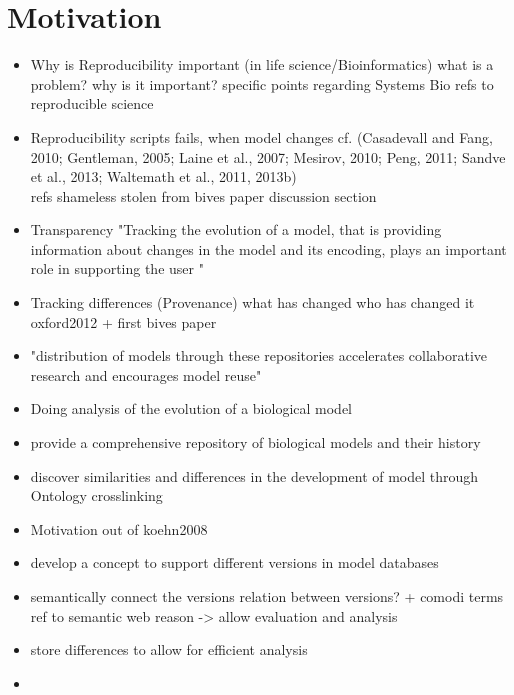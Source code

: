 \section{Motivation}

\begin{itemize}
\item Why is Reproducibility important (in life science/Bioinformatics)
	\subitem what is a problem?
	\subitem why is it important?
	\subitem specific points regarding Systems Bio
	\subitem refs to reproducible science
\item Reproducibility
	\subitem \sedml scripts fails, when model changes
	\subitem cf. (Casadevall and Fang, 2010; Gentleman, 2005; Laine et al., 2007; Mesirov, 2010; Peng, 2011; Sandve et al., 2013; Waltemath et al., 2011, 2013b) \\ refs shameless stolen from bives paper discussion section

\item Transparency
	\subitem "Tracking the evolution of a model, that is providing information about changes in the model and its encoding, plays an important role in supporting the user " \cite{Scharm2015}
\item Tracking differences (Provenance)
	\subitem what has changed
	\subitem who has changed it
	\subitem oxford2012 + first bives paper

\item "distribution of models through these repositories accelerates collaborative research and encourages model reuse" \cite{Scharm2015}

\item Doing analysis of the evolution of a biological model
\item provide a comprehensive repository of biological models and their history
\item discover similarities and differences in the development of model through Ontology crosslinking
\item Motivation out of koehn2008 \cite{Kohn2008}
\end{itemize}

\begin{itemize}
\item develop a concept to support different versions in model databases
	\subitem {}
	\subitem {}
\item semantically connect the versions
	\subitem relation between versions? + comodi terms
	\subitem ref to semantic web
	\subitem reason -> allow evaluation and analysis
\item store differences to allow for efficient analysis
\item {}
\end{itemize}
